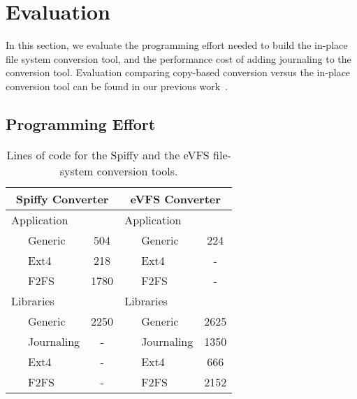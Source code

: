 \vspace{-0.75em}
\section{Evaluation\label{sec:Evaluation}}

In this section, we evaluate the programming effort needed to build the in-place file system conversion tool, and the performance cost of adding journaling to the conversion tool. Evaluation comparing copy-based conversion versus the in-place conversion tool can be found in our previous work~\cite{sun2018spiffy}.


\subsection{Programming Effort}

\begin{table}
\begin{small}
\begin{center}
\begin{tabular}{|llc|llc|}
\hline 
\multicolumn{3}{|c|}{\textbf{Spiffy Converter}} & \multicolumn{3}{c|}{\textbf{eVFS Converter}}\tabularnewline
\hline 
\multicolumn{3}{|l|}{Application} & \multicolumn{3}{l|}{Application}\tabularnewline
~ & Generic & 504 & ~ & Generic & 224\tabularnewline
 & Ext4 & 218 &  & Ext4 & -\tabularnewline
 & F2FS & 1780 &  & F2FS & -\tabularnewline
\hline 
\multicolumn{3}{|l|}{Libraries} & \multicolumn{3}{l|}{Libraries}\tabularnewline
 & Generic & 2250 &  & Generic & 2625\tabularnewline
 & Journaling & - &  & Journaling & 1350\tabularnewline
 & Ext4 & - &  & Ext4 & 666\tabularnewline
 & F2FS & - &  & F2FS & 2152\tabularnewline
\hline 
\end{tabular}
\end{center}
\end{small}
\vspace{-15pt}
\caption{\label{tab:programming-effort}Lines of code for the Spiffy and the eVFS file-system conversion tools.}
\vspace{-5pt}
\end{table}

